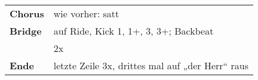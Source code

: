 \begin{tabular}{p{1.6cm}l}
	\textbf{Chorus} & wie vorher: satt                                                     \\
	\textbf{Bridge} & auf Ride, Kick 1, 1+, 3, 3+; Backbeat                                \\
	                & 2x                                                                   \\
	\textbf{Ende}   & letzte Zeile 3x, drittes mal auf „der Herr“ raus                     \\
\end{tabular}

